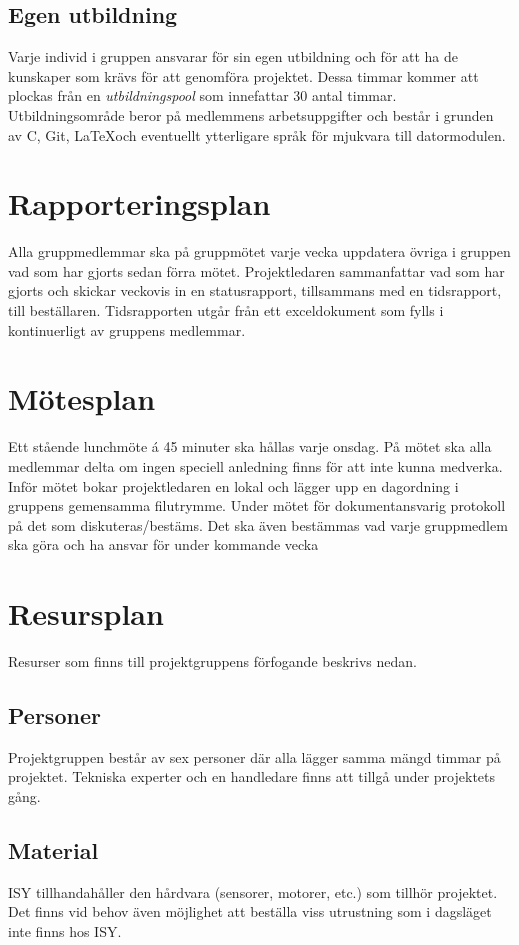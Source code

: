 \documentclass[11pt]{article}
\begin{document}
\begin{flushleft}
\subsection{Egen utbildning}
Varje individ i gruppen ansvarar för sin egen utbildning och för att ha de kunskaper som krävs för att genomföra projektet. Dessa timmar kommer att plockas från en \textit{utbildningspool} som innefattar 30 antal timmar. Utbildningsområde beror på medlemmens arbetsuppgifter och består i grunden av C, Git, \LaTeX och eventuellt ytterligare språk för mjukvara till datormodulen.

\section{Rapporteringsplan}
Alla gruppmedlemmar ska på gruppmötet varje vecka uppdatera övriga i gruppen vad som har gjorts sedan förra mötet. Projektledaren sammanfattar vad som har gjorts och skickar veckovis in en statusrapport, tillsammans med en tidsrapport, till beställaren. Tidsrapporten utgår från ett exceldokument som fylls i kontinuerligt av gruppens medlemmar.

\section{Mötesplan}
Ett stående lunchmöte á 45 minuter ska hållas varje onsdag. På mötet ska alla medlemmar delta om ingen speciell anledning finns för att inte kunna medverka. Inför mötet bokar projektledaren en lokal och lägger upp en dagordning i gruppens gemensamma filutrymme. Under mötet för dokumentansvarig protokoll på det som diskuteras/bestäms. Det ska även bestämmas vad varje gruppmedlem ska göra och ha ansvar för under kommande vecka

\pagebreak
\section{Resursplan}
Resurser som finns till projektgruppens förfogande beskrivs nedan.
\subsection{Personer}
Projektgruppen består av sex personer där alla lägger samma mängd timmar på projektet. Tekniska experter och en handledare finns att tillgå under projektets gång.

\subsection{Material}
ISY tillhandahåller den hårdvara (sensorer, motorer, etc.) som tillhör projektet. Det finns vid behov även möjlighet att beställa viss utrustning som i dagsläget inte finns hos ISY. 


\end{flushleft}
\end{document}
